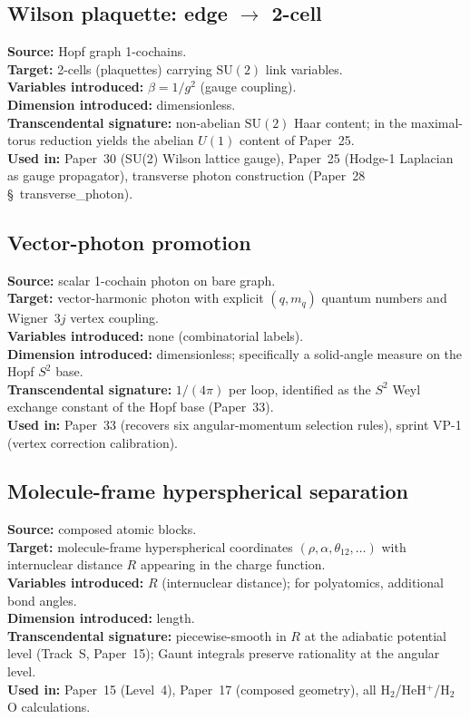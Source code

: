 \documentclass[11pt]{article}
\begin{document}
\subsection{Wilson plaquette: edge $\to$ 2-cell}
\label{sec:proj_wilson}
\textbf{Source:} Hopf graph 1-cochains.\\
\textbf{Target:} 2-cells (plaquettes) carrying $\mathrm{SU}(2)$ link
variables.\\
\textbf{Variables introduced:} $\beta = 1/g^2$ (gauge coupling).\\
\textbf{Dimension introduced:} dimensionless.\\
\textbf{Transcendental signature:} non-abelian $\mathrm{SU}(2)$ Haar
content; in the maximal-torus reduction yields the abelian
$U(1)$ content of Paper~25.\\
\textbf{Used in:} Paper~30 (SU(2) Wilson lattice gauge), Paper~25
(Hodge-1 Laplacian as gauge propagator), transverse photon
construction (Paper~28 \S~transverse\_photon).

\subsection{Vector-photon promotion}
\label{sec:proj_vector_photon}
\textbf{Source:} scalar 1-cochain photon on bare graph.\\
\textbf{Target:} vector-harmonic photon with explicit $(q, m_q)$
quantum numbers and Wigner~$3j$ vertex coupling.\\
\textbf{Variables introduced:} none (combinatorial labels).\\
\textbf{Dimension introduced:} dimensionless; specifically a
solid-angle measure on the Hopf $S^2$ base.\\
\textbf{Transcendental signature:} $1/(4\pi)$ per loop, identified
as the $S^2$ Weyl exchange constant of the Hopf base (Paper~33).\\
\textbf{Used in:} Paper~33 (recovers six angular-momentum selection
rules), sprint VP-1 (vertex correction calibration).

\subsection{Molecule-frame hyperspherical separation}
\label{sec:proj_molframe}
\textbf{Source:} composed atomic blocks.\\
\textbf{Target:} molecule-frame hyperspherical coordinates
$(\rho, \alpha, \theta_{12}, \ldots)$ with internuclear distance $R$
appearing in the charge function.\\
\textbf{Variables introduced:} $R$ (internuclear distance); for
polyatomics, additional bond angles.\\
\textbf{Dimension introduced:} length.\\
\textbf{Transcendental signature:} piecewise-smooth in $R$ at the
adiabatic potential level (Track~S, Paper~15); Gaunt integrals
preserve rationality at the angular level.\\
\textbf{Used in:} Paper~15 (Level~4), Paper~17 (composed geometry),
all H$_2$/HeH$^+$/H$_2$O calculations.
\end{document}
